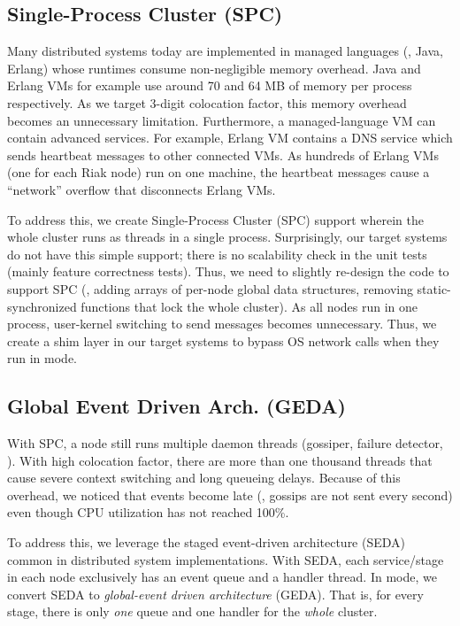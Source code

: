
\subsection{Single-Process Cluster (SPC)}
\label{sc-spc}

Many distributed systems today are implemented in managed languages (\eg,
Java, Erlang) whose runtimes consume non-negligible memory overhead.
Java and Erlang VMs for example use around 70 and 64 MB of memory 
  per process respectively.  As we target 3-digit colocation factor, this
memory overhead becomes an unnecessary limitation.
%
Furthermore, a managed-language VM can contain advanced services.  For
example, Erlang VM contains a DNS service which sends heartbeat messages
to other connected VMs.  As hundreds of Erlang VMs (one for each Riak
node) run on one machine, the heartbeat messages cause a ``network''
overflow that disconnects Erlang VMs.


To address this, we create Single-Process Cluster (SPC) support
wherein the whole cluster runs as threads in a single process.
Surprisingly, our target systems do not have this simple support; there is
no scalability check in the unit tests (mainly feature correctness
tests).  Thus, we need to slightly re-design the code to support SPC (\eg,
adding arrays of per-node global data structures, removing 
static-synchronized
functions that lock the whole cluster).
%
As all nodes run in one process, user-kernel switching to
send messages becomes unnecessary.  Thus, we create a shim layer in our
target systems to bypass OS network calls when they run in \sck mode.






\subsection{Global Event Driven Arch. (GEDA)}
\label{sc-geda}



With SPC, a node still runs multiple daemon threads (gossiper, failure
detector, \etc).  With high colocation factor, there are more than one
thousand threads that cause  severe context switching and long queueing
delays.  Because of this overhead, we noticed that events become late
(\eg, gossips are not sent every second) even though CPU 
utilization has not reached 100\%.

To address this, we leverage the staged event-driven architecture (SEDA)
\cite{Welsh+01-Seda} common in distributed system implementations.  
With SEDA, each
service/stage in each node exclusively has an event queue and a handler
thread.  In \sck mode, we convert SEDA to {\em global-event driven
  architecture} (GEDA).  That is, for every stage, there is only {\em one}
queue and one handler for the {\em whole} cluster.


